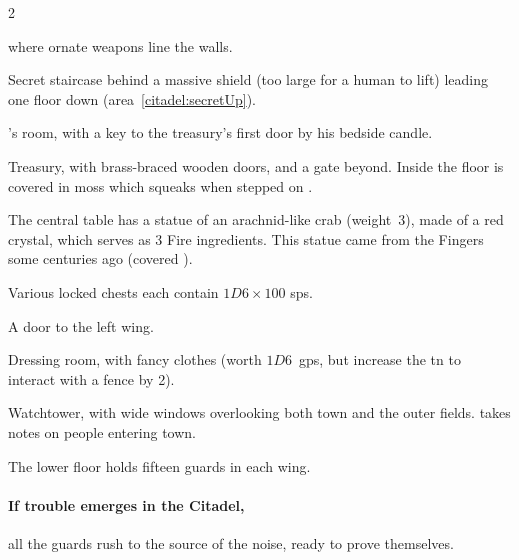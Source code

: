\begin{multicols}{2}
\begin{description}
\begin{description}
\begin{dlist}
      \end{dlist}
      \item[Right Wing:]
      where ornate weapons line the walls.
      \begin{dlist}
        \item
        Secret staircase behind a massive shield (too large for a human to lift) leading one floor down (\gls{area}~\ref{citadel:secretUp}).
        \label{citadel:shield}
        \item
        's room, with a key to the treasury's first door by his bedside candle.
        \label{citadel:townmaster}
        \item
        Treasury, with brass-braced wooden doors, and a gate beyond.
        Inside the floor is covered in moss which squeaks when stepped on%
        \iftoggle{judgement}{(see \textit{Judgement}, \autopageref{screechMoss})}{}.
        \label{citadel:treasury}

        The central table has a statue of an arachnid-like crab (\gls{weight}~3), made of a red crystal, which serves as 3 Fire \glspl{ingredient}.
        This statue came from the Fingers some centuries ago (covered ).

        Various locked chests each contain $1D6 \times 100$ \glspl{sp}.
        \item
        A door to the left wing.
        \item
        Dressing room, with fancy clothes (worth $1D6$~\glspl{gp}, but increase the \gls{tn} to interact with a fence by 2).
        \item
        Watchtower, with wide windows overlooking both \gls{town} and the outer fields.
         takes notes on people entering \gls{town}.
      \end{dlist}
    \end{description}
\end{description}

The lower floor holds fifteen guards in each wing.


\paragraph{If trouble emerges in the Citadel,}
all the guards rush to the source of the noise, ready to prove themselves.


\end{multicols}
